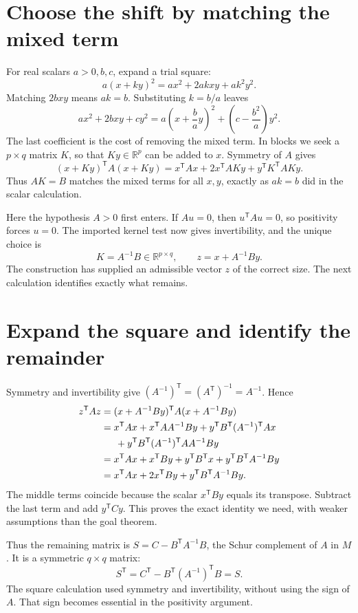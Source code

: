 \documentclass[12pt,reqno]{amsart}
\begin{document}
\section{Choose the shift by matching the mixed term}
For real scalars $a>0,b,c$, expand a trial square:
\[
 a(x+ky)^2=ax^2+2akxy+ak^2y^2.
\]
Matching $2bxy$ means $ak=b$. Substituting $k=b/a$ leaves
\begin{equation}\label{eq:scalar}
 ax^2+2bxy+cy^2
 =a\left(x+\frac ba y\right)^2+
   \left(c-\frac{b^2}{a}\right)y^2.
\end{equation}
The last coefficient is the cost of removing the mixed term. In blocks
we seek a $p\times q$ matrix $K$, so that $Ky\in\mathbb R^p$ can be
added to $x$. Symmetry of $A$ gives
\[
 (x+Ky)^{\mathsf T}A(x+Ky)
 =x^{\mathsf T}Ax+2x^{\mathsf T}AKy+y^{\mathsf T}K^{\mathsf T}AKy.
\]
Thus $AK=B$ matches the mixed terms for all $x,y$, exactly as $ak=b$
did in the scalar calculation.

Here the hypothesis $A>0$ first enters. If $Au=0$, then
$u^{\mathsf T}Au=0$, so positivity forces $u=0$. The imported kernel test
now gives invertibility, and the unique choice is
\[
 K=A^{-1}B\in\mathbb R^{p\times q},\qquad z=x+A^{-1}By.
\]
The construction has supplied an admissible vector $z$ of the correct
size. The next calculation identifies exactly what remains.

\section{Expand the square and identify the remainder}
Symmetry and invertibility give
$(A^{-1})^{\mathsf T}=(A^{\mathsf T})^{-1}=A^{-1}$. Hence
\begin{align*}
 z^{\mathsf T}Az
 &=(x+A^{-1}By)^{\mathsf T}A(x+A^{-1}By)\\
 &=x^{\mathsf T}Ax+x^{\mathsf T}AA^{-1}By
   +y^{\mathsf T}B^{\mathsf T}(A^{-1})^{\mathsf T}Ax\\
 &\hspace{1.5em}+y^{\mathsf T}B^{\mathsf T}(A^{-1})^{\mathsf T}AA^{-1}By\\
 &=x^{\mathsf T}Ax+x^{\mathsf T}By+y^{\mathsf T}B^{\mathsf T}x
   +y^{\mathsf T}B^{\mathsf T}A^{-1}By\\
 &=x^{\mathsf T}Ax+2x^{\mathsf T}By+y^{\mathsf T}B^{\mathsf T}A^{-1}By.
\end{align*}
The middle terms coincide because the scalar $x^{\mathsf T}By$ equals
its transpose. Subtract the last term and add $y^{\mathsf T}Cy$.
This proves the exact identity we need, with weaker assumptions than the
goal theorem.
\begin{lemma}\label{lem:square}

\end{lemma}
Thus the remaining matrix is $S=C-B^{\mathsf T}A^{-1}B$, the Schur
complement of $A$ in $M$. It is a symmetric $q\times q$ matrix:
\[
 S^{\mathsf T}=C^{\mathsf T}-B^{\mathsf T}(A^{-1})^{\mathsf T}B=S.
\]
The square calculation used symmetry and invertibility, without using
the sign of $A$. That sign becomes essential in the positivity argument.
\end{document}
